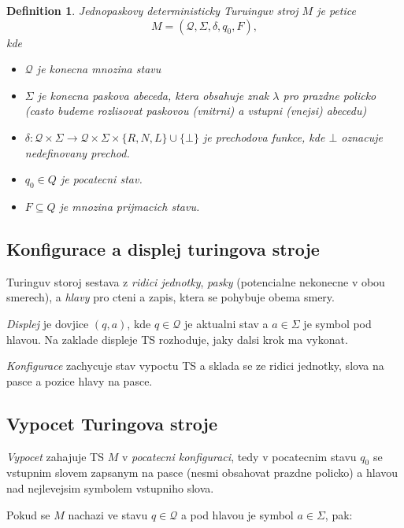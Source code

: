 \documentclass{article}
\theoremstyle{plain}
\theoremstyle{plain}
\newtheorem{defn}{Definition}
\theoremstyle{remark}
\begin{document}
\begin{defn}
    \emph{Jednopaskovy deterministicky Turuinguv stroj} $M$ je petice
    $$M = (\mathcal{Q}, \Sigma, \delta, q_0, F),$$
    kde
    \begin{itemize}
        \item $\mathcal{Q}$ je konecna mnozina stavu
        \item $\Sigma$ je konecna paskova abeceda, ktera obsahuje znak $\lambda$ pro prazdne policko (casto budeme rozlisovat paskovou (vnitrni) a vstupni (vnejsi) abecedu)
        \item $\delta : \mathcal{Q} \times \Sigma \rightarrow \mathcal{Q} \times \Sigma \times \{ R, N, L \} \cup \{ \bot \}$ je \emph{prechodova funkce}, kde $\bot$ oznacuje nedefinovany prechod.
        \item $q_0 \in Q$ je \emph{pocatecni stav}.
        \item $F \subseteq Q$ je \emph{mnozina prijmacich stavu}.
    \end{itemize}
\end{defn}

\subsection{Konfigurace a displej turingova stroje}

Turinguv storoj sestava z \emph{ridici jednotky}, \emph{pasky} (potencialne nekonecne v obou smerech), a \emph{hlavy} pro cteni a zapis, ktera se pohybuje obema smery.

\emph{Displej} je dovjice $(q, a)$, kde $q \in \mathcal{Q}$ je aktualni stav a $a \in \Sigma$ je symbol pod hlavou. Na zaklade displeje TS rozhoduje, jaky dalsi krok ma vykonat.

\emph{Konfigurace} zachycuje stav vypoctu TS a sklada se ze ridici jednotky, slova na pasce a pozice hlavy na pasce.

\subsection{Vypocet Turingova stroje}

\emph{Vypocet} zahajuje TS $M$ v \emph{pocatecni konfiguraci}, tedy v pocatecnim stavu $q_0$ se vstupnim slovem zapsanym na pasce (nesmi obsahovat prazdne policko) a hlavou nad nejlevejsim symbolem vstupniho slova.

Pokud se $M$ nachazi ve stavu $q \in \mathcal{Q}$ a pod hlavou je symbol $a \in \Sigma$, pak:
\end{document}
